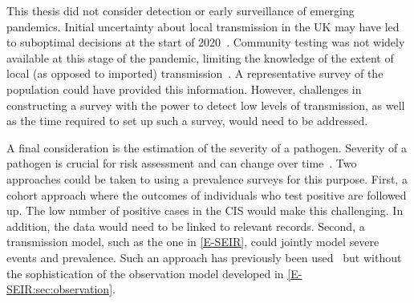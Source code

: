 \documentclass[thesis.tex]{subfiles}
\begin{document}
This thesis did not consider detection or early surveillance of emerging pandemics.
Initial uncertainty about local transmission in the UK may have led to suboptimal decisions at the start of 2020~\autocite{pellisChallenges}.
Community testing was not widely available at this stage of the pandemic, limiting the knowledge of the extent of local (as opposed to imported) transmission~\autocite{whittyTechReportCOVID}.
A representative survey of the population could have provided this information.
However, challenges in constructing a survey with the power to detect low levels of transmission, as well as the time required to set up such a survey, would need to be addressed.

A final consideration is the estimation of the severity of a pathogen.
Severity of a pathogen is crucial for risk assessment and can change over time~\autocite[e.g.][]{kirwanSeverityTrends}.
Two approaches could be taken to using a prevalence surveys for this purpose.
First, a cohort approach where the outcomes of individuals who test positive are followed up.
The low number of positive cases in the CIS would make this challenging.
In addition, the data would need to be linked to relevant records.
Second, a transmission model, such as the one in \cref{E-SEIR}, could jointly model severe events and prevalence.
Such an approach has previously been used~\autocite{daviesAssociation,ironsEstimating,knockKey,nicholsonImproving,pooleyEstimation,birrellRTM2} but without the sophistication of the observation model developed in \cref{E-SEIR:sec:observation}.

\ifSubfilesClassLoaded{
  \listoftodos
}{}
\end{document}
